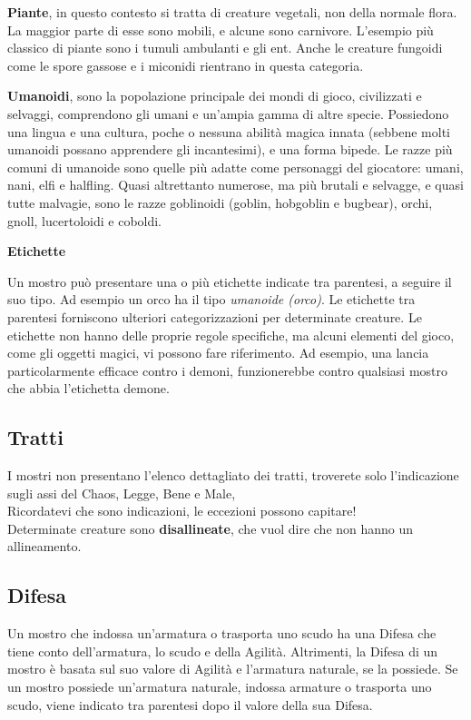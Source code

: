 \medskip\textbf{Piante}, in questo contesto si tratta di creature vegetali, non della normale flora. La maggior parte di esse sono mobili, e alcune sono carnivore. L'esempio più classico di piante sono i tumuli ambulanti e gli ent. Anche le creature fungoidi come le spore gassose e i miconidi rientrano in questa categoria.

\medskip\textbf{Umanoidi}, sono la popolazione principale dei mondi di gioco, civilizzati e selvaggi, comprendono gli umani e un'ampia gamma di altre specie. Possiedono una lingua e una cultura, poche o nessuna abilità magica innata (sebbene molti umanoidi possano apprendere gli incantesimi), e una forma bipede. Le razze più comuni di umanoide sono quelle più adatte come personaggi del giocatore: umani, nani, elfi e halfling. Quasi altrettanto numerose, ma più brutali e selvagge, e quasi tutte malvagie, sono le razze goblinoidi (goblin, hobgoblin e bugbear), orchi, gnoll, lucertoloidi e coboldi.

\medskip\textbf{Etichette}

Un mostro può presentare una o più etichette indicate tra parentesi, a seguire il suo tipo. Ad esempio un orco ha il tipo \emph{umanoide (orco)}. Le etichette tra parentesi forniscono ulteriori categorizzazioni per determinate creature. Le etichette non hanno delle proprie regole specifiche, ma alcuni elementi del gioco, come gli oggetti magici, vi possono fare riferimento. Ad esempio, una lancia particolarmente efficace contro i demoni, funzionerebbe contro qualsiasi mostro che abbia l'etichetta demone.

\subsection{Tratti}

I mostri non presentano l'elenco dettagliato dei tratti, troverete solo l'indicazione sugli assi del Chaos, Legge, Bene e Male,\\
Ricordatevi che sono indicazioni, le eccezioni possono capitare!\\

Determinate creature  sono \textbf{disallineate}, che vuol dire che non hanno un allineamento.

\subsection{Difesa}

Un mostro che indossa un'armatura o trasporta uno scudo ha una Difesa che tiene conto dell'armatura, lo scudo e della Agilità. Altrimenti, la Difesa di un mostro è basata sul suo valore di Agilità e l'armatura naturale, se la possiede. Se un mostro possiede un'armatura naturale, indossa armature o trasporta uno scudo, viene indicato tra parentesi dopo il valore della sua Difesa.

